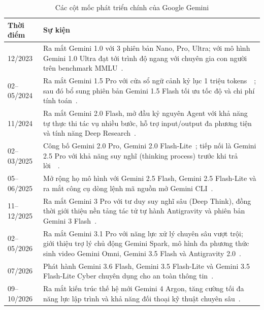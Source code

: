 \documentclass[12pt,a4paper]{article}
\begin{document}
\begin{table}[H]
  \centering
  \caption{Các cột mốc phát triển chính của Google Gemini}
  \label{tab:mocs}
  \begin{tabular}{lp{11.5cm}}
    \toprule
    Thời điểm & Sự kiện \\
    \midrule
    12/2023 & Ra mắt Gemini 1.0 với 3 phiên bản Nano, Pro, Ultra; với mô hình Gemini 1.0 Ultra đạt tới trình độ ngang với chuyên gia con người trên benchmark MMLU~\cite{team2023gemini}. \\
    02--05/2024 & Ra mắt Gemini 1.5 Pro với cửa sổ ngữ cảnh kỷ lục 1 triệu tokens~\cite{team2024gemini}~\cite{google-gemini-15-pro}; sau đó bổ sung phiên bản Gemini 1.5 Flash tối ưu tốc độ và chi phí tính toán~\cite{google-gemini-15-flash-debut}. \\
    11/2024 & Ra mắt Gemini 2.0 Flash, mở đầu kỷ nguyên Agent với khả năng tự thực thi tác vụ nhiều bước, hỗ trợ input/output đa phương tiện và tính năng Deep Research~\cite{google-gemini-2-agent}. \\
    02--03/2025 & Công bố Gemini 2.0 Pro, Gemini 2.0 Flash-Lite~\cite{google-gemini-2-updates-feb2025}; tiếp nối là Gemini 2.5 Pro với khả năng suy nghĩ (thinking process) trước khi trả lời~\cite{comanici2025gemini}~\cite{google-gemini-25-thinking-mar2025}. \\
    05--06/2025 & Mở rộng họ mô hình với Gemini 2.5 Flash, Gemini 2.5 Flash-Lite và ra mắt công cụ dòng lệnh mã nguồn mở Gemini CLI~\cite{google-gemini-cli}. \\
    11--12/2025 & Ra mắt Gemini 3 Pro với tư duy suy nghĩ sâu (Deep Think), đồng thời giới thiệu nền tảng tác tử tự hành Antigravity và phiên bản Gemini 3 Flash~\cite{google-gemini-3}. \\
    02--05/2026 & Ra mắt Gemini 3.1 Pro với năng lực xử lý chuyên sâu vượt trội; giới thiệu trợ lý chủ động Gemini Spark, mô hình đa phương thức sinh video Gemini Omni, Gemini 3.5 Flash và Antigravity 2.0~\cite{google-spark-omni}. \\
    07/2026 & Phát hành Gemini 3.6 Flash, Gemini 3.5 Flash-Lite và Gemini 3.5 Flash-Lite Cyber chuyên dụng cho an toàn thông tin~\cite{techcrunch-gemini-models-2026}. \\
    09--10/2026 & Ra mắt kiến trúc thế hệ mới Gemini 4 Argon, tăng cường tối đa năng lực lập trình và khả năng đối thoại kỹ thuật chuyên sâu~\cite{google-gemini-4-argon}. \\
    \bottomrule
  \end{tabular}
\end{table}
\end{document}
